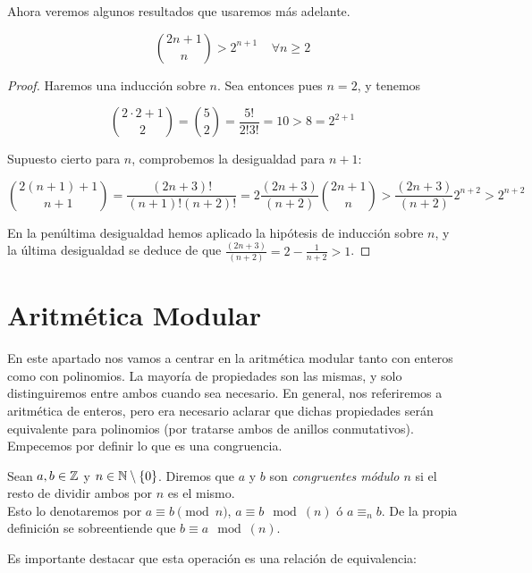 Ahora veremos algunos resultados que usaremos más adelante.

\begin{lema}\label{binomio_cota_inferior_2n}
	\[ \binom{2n + 1}{n} > 2^{n+1}\;\;\;\;\forall n \geq 2 \]
\end{lema}

\begin{proof}
	Haremos una inducción sobre $n$. Sea entonces pues $n=2$, y tenemos
	
	\[ \binom{2\cdot2 + 1}{2} = \binom{5}{2} = \frac{5!}{2!3!} = 10 > 8 = 2^{2+1} \]
	
	Supuesto cierto para $n$, comprobemos la desigualdad para $n+1$:
	
	\[ \binom{2(n+1) + 1}{n+1} = \frac{(2n+3)!}{(n+1)!(n+2)!} = 2\frac{(2n+3)}{(n+2)}\binom{2n+1}{n} > \frac{(2n+3)}{(n+2)}2^{n+2} > 2^{n+2} \]
	
	En la penúltima desigualdad hemos aplicado la hipótesis de inducción sobre $n$, y la última desigualdad se deduce de que $\frac{(2n+3)}{(n+2)} = 2 - \frac{1}{n+2} > 1$.
\end{proof}

\section{Aritmética Modular}

En este apartado nos vamos a centrar en la aritmética modular tanto con enteros como con polinomios. La mayoría de propiedades son las mismas, y solo distinguiremos entre ambos cuando sea necesario. En general, nos referiremos a aritmética de enteros, pero era necesario aclarar que dichas propiedades serán equivalente para polinomios (por tratarse ambos de anillos conmutativos).\\

Empecemos por definir lo que es una congruencia.

\begin{definicion}
	Sean $a, b \in \mathbb{Z}$ y $n \in \mathbb{N} \setminus \{0\}$. Diremos que $a$ y $b$ son \textit{congruentes módulo $n$} si el resto de dividir ambos por $n$ es el mismo.\\
	
	Esto lo denotaremos por $a \equiv b \pmod{n}$, $a \equiv b \mod(n)$ ó $a \equiv_n b$. De la propia definición se sobreentiende que $b \equiv a \mod(n)$.
\end{definicion}

Es importante destacar que esta operación es una relación de equivalencia:

